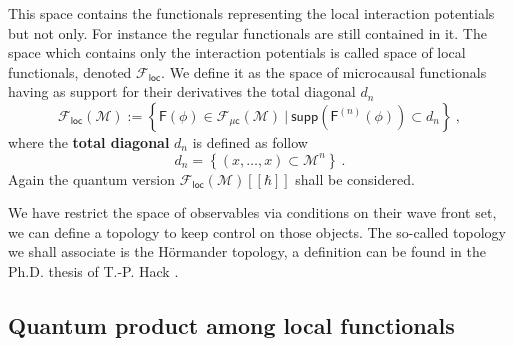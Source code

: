 \documentclass[11pt]{book}
\newcommand{\supp}{\mathsf{supp}}
\newcommand{\loc}{\mathsf{loc}}
\newcommand{\Fcal}{\mathcal{F}}
\newcommand{\Mcal}{\mathcal{M}}
\newcommand{\Fsf}{\mathsf{F}}
\newcommand{\csf}{\mathsf{c}}
\theoremstyle{break}
\begin{document}
This space contains the functionals representing the local interaction potentials but not only. For instance the regular functionals are still contained in it. The space which contains only the interaction potentials is called space of local functionals, denoted $\mathcal{F}_\loc$. We define it as the space of microcausal functionals having as support for their derivatives the total diagonal $d_n$
%
\begin{equation*}
\Fcal_\loc(\Mcal) := \left\{ \Fsf(\phi) \in \Fcal_{\mu\csf}(\Mcal) \ \bigg| \ \supp\left(\Fsf^{(n)}(\phi)\right) \subset d_n \right\} \ ,
\label{eq:func_loc}
\end{equation*}
\index{$\Fcal_{\mathsf{loc}}(\Mcal)$}
%
where the \textbf{total diagonal} $d_n$ is defined as follow
%
\begin{equation}
d_n = \left\{ (x,\dots,x) \subset \Mcal^n \right\} \ .
\label{eq:total_diag}
\end{equation}
%
Again the quantum version $\Fcal_{\mathsf{loc}}(\Mcal)[[\hbar]]$ shall be considered.


\bigskip


We have restrict the space of observables via conditions on their wave front set, we can define a topology to keep control on those objects. The so-called topology we shall associate is the Hörmander topology, a definition can be found in the Ph.D. thesis of T.-P. Hack \cite[Chapter III]{hack_backreaction_2010}.


\subsection{Quantum product among local functionals}
\end{document}
